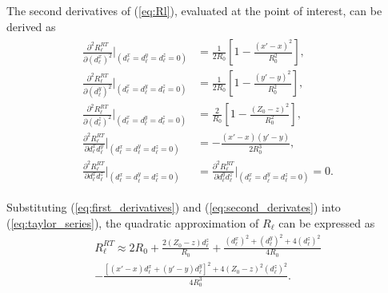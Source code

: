 \documentclass{ieeeaccess}
\begin{document}
The second derivatives of (\ref{eq:Rl}), evaluated at the point of interest, can be derived as
\begin{align}
\begin{split}
    \label{eq:second_derivates}
    \frac{\partial^2 R_\ell^{RT}}{\partial (d_\ell^x)^2} \biggr\rvert_{(d_\ell^x = d_\ell^y = d_\ell^z = 0)} &= \frac{1}{2R_0} \left[ 1 - \frac{(x'-x)^2}{R_0^2} \right], \\
    \frac{\partial^2 R_\ell^{RT}}{\partial (d_\ell^y)^2} \biggr\rvert_{(d_\ell^x = d_\ell^y = d_\ell^z = 0)} &= \frac{1}{2R_0} \left[ 1 - \frac{(y'-y)^2}{R_0^2} \right], \\
    \frac{\partial^2 R_\ell^{RT}}{\partial (d_\ell^z)^2} \biggr\rvert_{(d_\ell^x = d_\ell^y = d_\ell^z = 0)} &= \frac{2}{R_0} \left[ 1 - \frac{(Z_0-z)^2}{R_0^2} \right], \\
    \frac{\partial^2 R_\ell^{RT}}{\partial d_\ell^x d_\ell^y} \biggr\rvert_{(d_\ell^x = d_\ell^y = d_\ell^z = 0)} &= -\frac{(x'-x)(y'-y)}{2R_0^3}, \\
    \frac{\partial^2 R_\ell^{RT}}{\partial d_\ell^x d_\ell^z} \biggr\rvert_{(d_\ell^x = d_\ell^y = d_\ell^z = 0)} &= \frac{\partial^2 R_\ell^{RT}}{\partial d_\ell^y d_\ell^z} \biggr\rvert_{(d_\ell^x = d_\ell^y = d_\ell^z = 0)} = 0.
\end{split}
\end{align}

Substituting (\ref{eq:first_derivatives}) and (\ref{eq:second_derivates}) into (\ref{eq:taylor_series}), the quadratic approximation of $R_\ell$ can be expressed as
\begin{multline}
\label{Rl_approximation}
    R_\ell^{RT}\approx 2R_0 + \frac{2(Z_0-z)d_\ell^z}{R_0} + \frac{(d_\ell^x)^2 + (d_\ell^y)^2 + 4(d_\ell^z)^2}{4R_0} \\
    - \frac{\left[(x'-x)d_\ell^x + (y'-y)d_\ell^y\right]^2 + 4(Z_0-z)^2(d_\ell^z)^2}{4R_0^3}.
\end{multline}

\printbibliography
\end{document}
